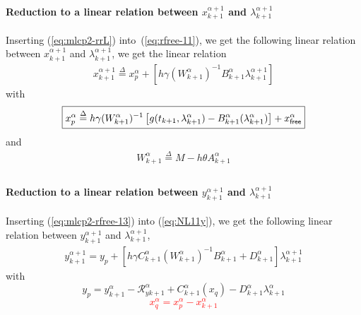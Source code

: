 \paragraph{Reduction to a linear relation between  $x^{\alpha+1}_{k+1}$ and
$\lambda^{\alpha+1}_{k+1}$}

Inserting (\ref{eq:mlcp2-rrL}) into~(\ref{eq:rfree-11}), we get the following linear relation between $x^{\alpha+1}_{k+1}$ and
$\lambda^{\alpha+1}_{k+1}$, we get the linear relation
\begin{equation}
  \label{eq:mlcp2-rfree-13}
  \begin{array}{l}
 \boxed{   x^{\alpha+1}_{k+1}\stackrel{\Delta}{=} x^\alpha_p + \left[ h \gamma (W^{\alpha}_{k+1})^{-1}    B^{\alpha}_{k+1} \lambda^{\alpha+1}_{k+1}\right]}
   \end{array}
\end{equation}
with
\begin{equation}
  \boxed{x^\alpha_p \stackrel{\Delta}{=}  h\gamma(W^{\alpha}_{k+1} )^{-1}\left[g(t_{k+1},\lambda^{\alpha}_{k+1})
    -B^{\alpha}_{k+1} (\lambda^{\alpha}_{k+1}) \right ] +x^\alpha_{{\sf free}}}
\end{equation}
and
\begin{equation}
  \label{eq:mlcp2-NL9}
  \begin{array}{l}
    W^{\alpha}_{k+1} \stackrel{\Delta}{=} M-h\theta A^{\alpha}_{k+1}\\
  \end{array}
\end{equation}


\paragraph{Reduction to a linear relation between  $y^{\alpha+1}_{k+1}$ and
$\lambda^{\alpha+1}_{k+1}$}

Inserting (\ref{eq:mlcp2-rfree-13}) into (\ref{eq:NL11y}), we get the following linear relation between $y^{\alpha+1}_{k+1}$ and $\lambda^{\alpha+1}_{k+1}$,
\begin{equation}
   \begin{array}{l}
 y^{\alpha+1}_{k+1} = y_p + \left[ h \gamma C^{\alpha}_{k+1} ( W^{\alpha}_{k+1})^{-1}  B^{\alpha}_{k+1} + D^{\alpha}_{k+1} \right]\lambda^{\alpha+1}_{k+1}
   \end{array}
\end{equation}
with
\begin{equation}\boxed{
y_p = y^{\alpha}_{k+1} -\mathcal R^{\alpha}_{yk+1} + C^{\alpha}_{k+1}(x_q) -
D^{\alpha}_{k+1} \lambda^{\alpha}_{k+1} }
\end{equation}
\textcolor{red}{
  \begin{equation}
    \boxed{ x^\alpha_q= x^\alpha_p - x^{\alpha}_{k+1}\label{eq:mlcp2-xqq}}
  \end{equation}
}

